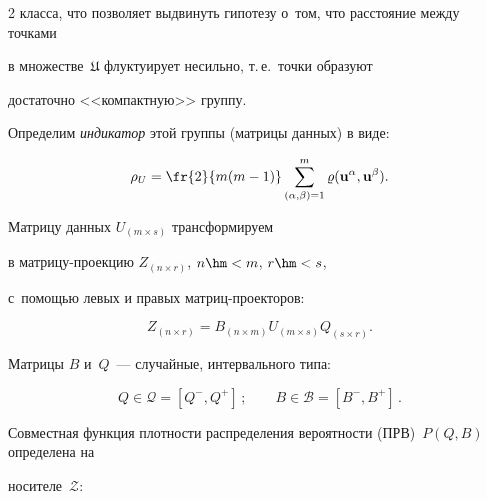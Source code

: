 \begin{multicols}{2}
класса, что позволяет выдвинуть гипотезу о~том, что расстояние между точками 


в множестве~$\mathfrak{U}$ флуктуирует несильно, т.\,е.\ точки образуют 


достаточно <<компактную>> группу.





Определим \textit{индикатор} этой группы (матрицы данных) в виде:





\noindent


\begin{equation}


\label{4_1}


\rho_U = \fr{2}{m(m-1)} \sum\limits^m_{(\alpha,\beta)=1} 


\varrho(\mathbf{u}^{\alpha}, \mathbf{u}^{\beta}).


\end{equation}





Матрицу данных $U_{(m \times s)}$ трансформируем 


в мат\-ри\-цу-про\-ек\-цию $Z_{(n \times r)}$, $n \hm< m$, $r \hm< s$, 


с~по\-мощью левых и правых мат\-риц-про\-ек\-то\-ров:


\begin{equation*}




Z_{(n \times r)} = B_{(n \times m)} U_{(m \times s)} Q_{(s \times r)}.


\end{equation*}


Матрицы $B$ и~$Q$~--- случайные, интервального типа:


\begin{equation*}




Q \in \mathcal{Q} = [Q^-, Q^+]\,;\qquad B \in \mathcal{B} = [B^-, B^+]\,.


\end{equation*}





\noindent


Совместная функция плотности распределения ве\-ро\-ят\-ности (ПРВ)~$P(Q,B)$  определена на 


носителе~$\mathcal{Z}$:



\end{multicols}
